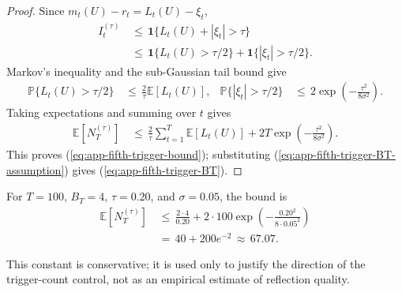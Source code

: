 \documentclass{article} %
\renewcommand{\eqref}[1]{\textup{(\ref{#1})}}
\begin{document}
\begin{proof}
Since \(m_t(U)-r_t=L_t(U)-\xi_t\),
\begin{equation}
\label{eq:app-fifth-trigger-proof-indicator}
\begin{aligned}
I_t^{(\tau)}
&\,\le\,
\mathbf{1}\{L_t(U)+|\xi_t|>\tau\}
\\
&\,\le\,
\mathbf{1}\{L_t(U)>\tau/2\}
+
\mathbf{1}\{|\xi_t|>\tau/2\}.
\end{aligned}
\end{equation}
Markov's inequality and the sub-Gaussian tail bound give
\begin{equation}
\begin{aligned}
\mathbb{P}\{L_t(U)>\tau/2\}
&\,\leq\,\frac{2}{\tau}\mathbb E[L_t(U)], &
\mathbb{P}\{|\xi_t|>\tau/2\}
&\,\leq\,2\exp\!\left(-\frac{\tau^2}{8\sigma^2}\right).
\end{aligned}
\end{equation}
Taking expectations and summing over \(t\) gives
\begin{equation}
\label{eq:app-fifth-trigger-proof-sum}
\begin{aligned}
\mathbb{E}[N_T^{(\tau)}]
&\,\le\,
\frac{2}{\tau}
\sum_{t=1}^{T}\mathbb{E}[L_t(U)]
+
2T\exp\!\left(
-\frac{\tau^2}{8\sigma^2}
\right).
\end{aligned}
\end{equation}
This proves \eqref{eq:app-fifth-trigger-bound}; substituting
\eqref{eq:app-fifth-trigger-BT-assumption} gives
\eqref{eq:app-fifth-trigger-BT}.
\end{proof}

For \(T=100\), \(B_T=4\), \(\tau=0.20\), and \(\sigma=0.05\), the bound is
\begin{equation}
\label{eq:app-fifth-trigger-example}
\begin{aligned}
\mathbb{E}[N_T^{(\tau)}]
&\,\le\,
\frac{2\cdot 4}{0.20}
+
2\cdot 100\exp\!\left(
-\frac{0.20^2}{8\cdot 0.05^2}
\right)
\\
&\,=\,
40+200e^{-2}
\,\approx\,67.07.
\end{aligned}
\end{equation}

This constant is conservative; it is used only to justify the direction of the trigger-count control, not as an empirical estimate of reflection quality.
\end{document}

